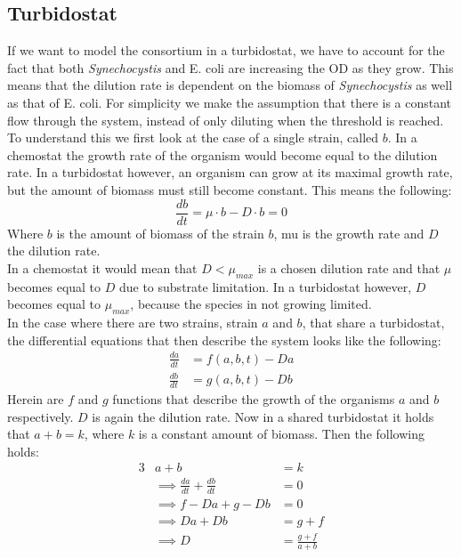 \documentclass[10pt]{report}
\begin{document}
\subsection{Turbidostat}\label{sec:turb}
If we want to model the consortium in a turbidostat, we have to account for the fact that both \textit{Synechocystis} and E. coli are increasing the OD as they grow. This means that the dilution rate is dependent on the biomass of \textit{Synechocystis} as well as that of E. coli.
For simplicity we make the assumption that there is a constant flow through the system, instead of only diluting when the threshold is reached.  To understand this we first look at the case of a single strain, called $b$. In a chemostat the growth rate of the organism would become equal to the dilution rate. In a turbidostat however, an organism can grow at its maximal growth rate, but the amount of biomass must still become constant. This means the following:
\begin{equation}
 \frac{db}{dt} = \mu \cdot b - D \cdot b = 0
\end{equation}
Where $b$ is the amount of biomass of the strain $b$, mu is the growth rate and $D$ the dilution rate.\\
In a chemostat it would mean that $D<\mu_{max}$ is a chosen dilution rate and that $\mu$ becomes equal to $D$ due to substrate limitation. In a turbidostat however, $D$ becomes equal to $\mu_{max}$, because the species in not growing limited.\\
In the case where there are two strains, strain $a$ and $b$, that share a turbidostat, the differential equations that then describe the system looks like the following:
\begin{align}
 \frac{da}{dt} &= f(a,b,t) - Da\\
 \frac{db}{dt} &= g(a,b,t) - Db
\end{align}
Herein are $f$ and $g$ functions that describe the growth of the organisms $a$ and $b$ respectively. $D$ is again the dilution rate. Now in a shared turbidostat it holds that $a+b=k$, where $k$ is a constant amount of biomass. Then the following holds:
\begin{alignat}{3}
 & a+b &= k \\
 &\implies \frac{da}{dt} + \frac{db}{dt} &= 0\\
 &\implies f - Da + g - Db & = 0\\
 &\implies Da + Db &= g + f \\
 &\implies D &= \frac{g + f}{a+b}
\end{alignat}
\end{document}

